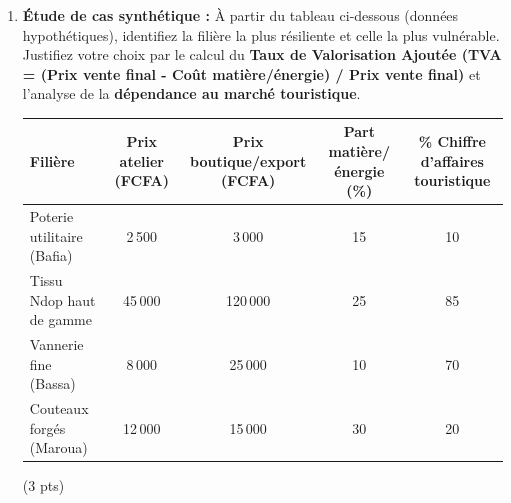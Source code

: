 \documentclass[11pt]{article}
\begin{document}
\begin{exercice}
\begin{enumerate}
    \item \textbf{Étude de cas synthétique :} À partir du tableau ci-dessous (données hypothétiques), identifiez la filière la plus résiliente et celle la plus vulnérable. Justifiez votre choix par le calcul du \textbf{Taux de Valorisation Ajoutée (TVA = (Prix vente final - Coût matière/énergie) / Prix vente final)} et l'analyse de la \textbf{dépendance au marché touristique}.
    
    \begin{tabular}{|l|c|c|c|c|}
    \hline
    \textbf{Filière} & \textbf{Prix atelier (FCFA)} & \textbf{Prix boutique/export (FCFA)} & \textbf{Part matière/énergie (\%)} & \textbf{\% Chiffre d'affaires touristique} \\
    \hline
    Poterie utilitaire (Bafia) & 2\,500 & 3\,000 & 15 & 10 \\
    Tissu Ndop haut de gamme & 45\,000 & 120\,000 & 25 & 85 \\
    Vannerie fine (Bassa) & 8\,000 & 25\,000 & 10 & 70 \\
    Couteaux forgés (Maroua) & 12\,000 & 15\,000 & 30 & 20 \\
    \hline
    \end{tabular}
    (3 pts)
\end{enumerate}
\end{exercice}
\end{document}
